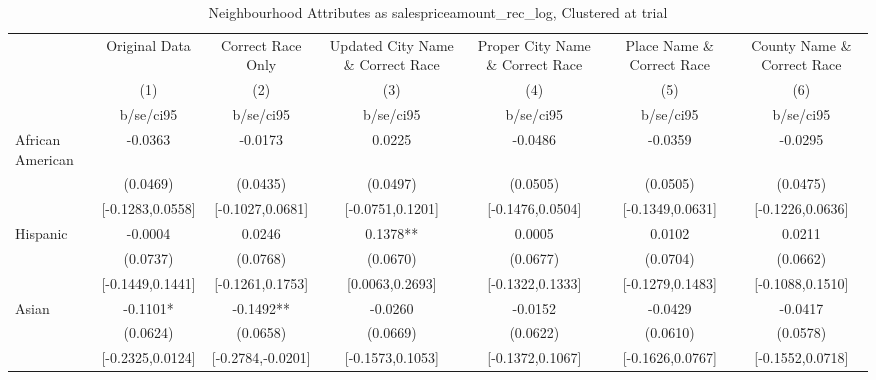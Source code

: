 \documentclass{article}
\begin{document}
\begin{table}[htbp]\centering
\def\sym#1{\ifmmode^{#1}\else\(^{#1}\)\fi}
\caption{Neighbourhood Attributes as salespriceamount\_rec\_log, Clustered at trial}
\begin{tabular}{l*{6}{c}}
\toprule
                    &\multicolumn{1}{c}{Original Data}&\multicolumn{1}{c}{Correct Race Only}&\multicolumn{1}{c}{Updated City Name \& Correct Race}&\multicolumn{1}{c}{Proper City Name \& Correct Race}&\multicolumn{1}{c}{Place Name \& Correct Race}&\multicolumn{1}{c}{County Name \& Correct Race}\\\cmidrule(lr){2-2}\cmidrule(lr){3-3}\cmidrule(lr){4-4}\cmidrule(lr){5-5}\cmidrule(lr){6-6}\cmidrule(lr){7-7}
                    &\multicolumn{1}{c}{(1)}   &\multicolumn{1}{c}{(2)}   &\multicolumn{1}{c}{(3)}   &\multicolumn{1}{c}{(4)}   &\multicolumn{1}{c}{(5)}   &\multicolumn{1}{c}{(6)}   \\
                    &   b/se/ci95   &   b/se/ci95   &   b/se/ci95   &   b/se/ci95   &   b/se/ci95   &   b/se/ci95   \\
\midrule
African American    &     -0.0363   &     -0.0173   &      0.0225   &     -0.0486   &     -0.0359   &     -0.0295   \\
                    &    (0.0469)   &    (0.0435)   &    (0.0497)   &    (0.0505)   &    (0.0505)   &    (0.0475)   \\
                    &[-0.1283,0.0558]   &[-0.1027,0.0681]   &[-0.0751,0.1201]   &[-0.1476,0.0504]   &[-0.1349,0.0631]   &[-0.1226,0.0636]   \\
Hispanic            &     -0.0004   &      0.0246   &      0.1378** &      0.0005   &      0.0102   &      0.0211   \\
                    &    (0.0737)   &    (0.0768)   &    (0.0670)   &    (0.0677)   &    (0.0704)   &    (0.0662)   \\
                    &[-0.1449,0.1441]   &[-0.1261,0.1753]   &[0.0063,0.2693]   &[-0.1322,0.1333]   &[-0.1279,0.1483]   &[-0.1088,0.1510]   \\
Asian               &     -0.1101*  &     -0.1492** &     -0.0260   &     -0.0152   &     -0.0429   &     -0.0417   \\
                    &    (0.0624)   &    (0.0658)   &    (0.0669)   &    (0.0622)   &    (0.0610)   &    (0.0578)   \\
                    &[-0.2325,0.0124]   &[-0.2784,-0.0201]   &[-0.1573,0.1053]   &[-0.1372,0.1067]   &[-0.1626,0.0767]   &[-0.1552,0.0718]   \\

\end{tabular}
\end{table}
\end{document}
